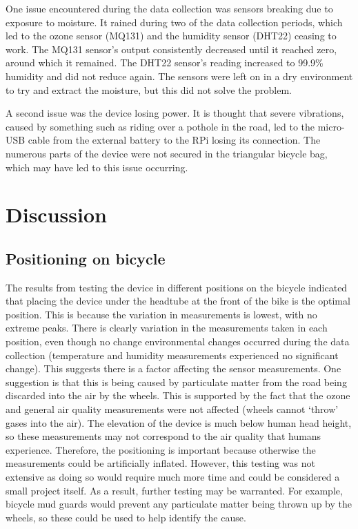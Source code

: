 \documentclass[11pt]{report}
\begin{document}
One issue encountered during the data collection was sensors breaking due to exposure to moisture. It rained during two of the data collection periods, which led to the ozone sensor (MQ131) and the humidity sensor (DHT22) ceasing to work. The MQ131 sensor's output consistently decreased until it reached zero, around which it remained. The DHT22 sensor's reading increased to 99.9\% humidity and did not reduce again. The sensors were left on in a dry environment to try and extract the moisture, but this did not solve the problem.

A second issue was the device losing power. It is thought that severe vibrations, caused by something such as riding over a pothole in the road, led to the micro-USB cable from the external battery to the RPi losing its connection. The numerous parts of the device were not secured in the triangular bicycle bag, which may have led to this issue occurring.

\section{Discussion}

\subsection{Positioning on bicycle}

The results from testing the device in different positions on the bicycle indicated that placing the device under the headtube at the front of the bike is the optimal position. This is because the variation in measurements is lowest, with no extreme peaks. There is clearly variation in the measurements taken in each position, even though no change environmental changes occurred during the data collection (temperature and humidity measurements experienced no significant change). This suggests there is a factor affecting the sensor measurements. One suggestion is that this is being caused by particulate matter from the road being discarded into the air by the wheels. This is supported by the fact that the ozone and general air quality measurements were not affected (wheels cannot `throw' gases into the air). The elevation of the device is much below human head height, so these measurements may not correspond to the air quality that humans experience. Therefore, the positioning is important because otherwise the measurements could be artificially inflated. However, this testing was not extensive as doing so would require much more time and could be considered a small project itself. As a result, further testing may be warranted. For example, bicycle mud guards would prevent any particulate matter being thrown up by the wheels, so these could be used to help identify the cause.
\end{document}
